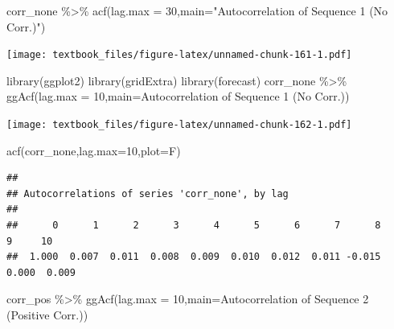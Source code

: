 \documentclass[
  11pt,
]{book}
\newenvironment{Shaded}{\begin{snugshade}}{\end{snugshade}}
\newcommand{\AttributeTok}[1]{\textcolor[rgb]{0.77,0.63,0.00}{#1}}
\newcommand{\DecValTok}[1]{\textcolor[rgb]{0.00,0.00,0.81}{#1}}
\newcommand{\FunctionTok}[1]{\textcolor[rgb]{0.00,0.00,0.00}{#1}}
\newcommand{\NormalTok}[1]{#1}
\newcommand{\SpecialCharTok}[1]{\textcolor[rgb]{0.00,0.00,0.00}{#1}}
\newcommand{\StringTok}[1]{\textcolor[rgb]{0.31,0.60,0.02}{#1}}
\theoremstyle{definition}
\theoremstyle{definition}
\theoremstyle{definition}
\theoremstyle{definition}
\theoremstyle{remark}
\begin{document}
\begin{Shaded}
\begin{Highlighting}[]
\NormalTok{corr\_none }\SpecialCharTok{\%\textgreater{}\%} \FunctionTok{acf}\NormalTok{(}\AttributeTok{lag.max =} \DecValTok{30}\NormalTok{,}\AttributeTok{main=}\StringTok{"Autocorrelation of Sequence 1 (No Corr.)"}\NormalTok{)}
\end{Highlighting}
\end{Shaded}

\texttt{[image: textbook\_files/figure-latex/unnamed-chunk-161-1.pdf]}

\vfill

\newpage

\begin{Shaded}
\begin{Highlighting}[]
\FunctionTok{library}\NormalTok{(ggplot2)}
\FunctionTok{library}\NormalTok{(gridExtra)}
\FunctionTok{library}\NormalTok{(forecast)}
\NormalTok{corr\_none }\SpecialCharTok{\%\textgreater{}\%} \FunctionTok{ggAcf}\NormalTok{(}\AttributeTok{lag.max =} \DecValTok{10}\NormalTok{,}\AttributeTok{main=}\StringTok{\textquotesingle{}Autocorrelation of Sequence 1 (No Corr.)\textquotesingle{}}\NormalTok{)}
\end{Highlighting}
\end{Shaded}

\texttt{[image: textbook\_files/figure-latex/unnamed-chunk-162-1.pdf]}

\begin{Shaded}
\begin{Highlighting}[]
\FunctionTok{acf}\NormalTok{(corr\_none,}\AttributeTok{lag.max=}\DecValTok{10}\NormalTok{,}\AttributeTok{plot=}\NormalTok{F)}
\end{Highlighting}
\end{Shaded}

\begin{verbatim}
## 
## Autocorrelations of series 'corr_none', by lag
## 
##      0      1      2      3      4      5      6      7      8      9     10 
##  1.000  0.007  0.011  0.008  0.009  0.010  0.012  0.011 -0.015  0.000  0.009
\end{verbatim}

\newpage

\begin{Shaded}
\begin{Highlighting}[]
\NormalTok{corr\_pos }\SpecialCharTok{\%\textgreater{}\%} \FunctionTok{ggAcf}\NormalTok{(}\AttributeTok{lag.max =} \DecValTok{10}\NormalTok{,}\AttributeTok{main=}\StringTok{\textquotesingle{}Autocorrelation of Sequence 2 (Positive Corr.)\textquotesingle{}}\NormalTok{)}
\end{Highlighting}
\end{Shaded}
\end{document}
